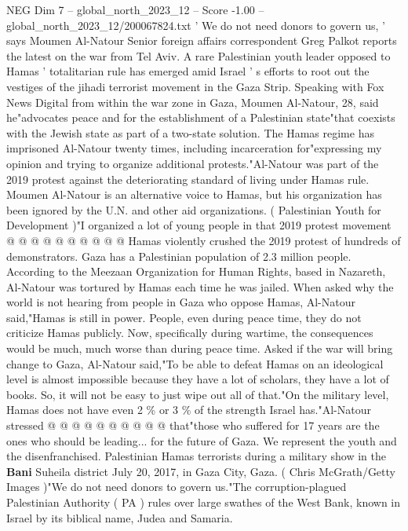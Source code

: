 \begin{textsample}{NEG Dim 7 – global\_north\_2023\_12 – Score -1.00 – global\_north\_2023\_12/200067824.txt}  \label{ex:f7_neg_301}
' We do not need donors to govern us, ' says Moumen Al-Natour Senior foreign affairs correspondent Greg Palkot reports the latest on the war from Tel Aviv.
A rare Palestinian youth leader opposed to Hamas ' totalitarian rule has emerged amid Israel ' s efforts to root out the vestiges of the jihadi terrorist movement in the Gaza Strip.
Speaking with Fox News Digital from within the war zone in Gaza, Moumen Al-Natour, 28, said he"advocates peace and for the establishment of a Palestinian state"that coexists with the Jewish state as part of a two-state solution.
The Hamas regime has imprisoned Al-Natour twenty times, including incarceration for"expressing my opinion and trying to organize additional protests."Al-Natour was part of the 2019 protest against the deteriorating standard of living under Hamas rule.
Moumen Al-Natour is an alternative voice to Hamas, but his organization has been ignored by the U.N. and other aid organizations. ( Palestinian Youth for Development )"I organized a lot of young people in that 2019 protest movement @ @ @ @ @ @ @ @ @ @ Hamas violently crushed the 2019 protest of hundreds of demonstrators.
Gaza has a Palestinian population of 2.3 million people.
According to the Meezaan Organization for Human Rights, based in Nazareth, Al-Natour was tortured by Hamas each time he was jailed.
When asked why the world is not hearing from people in Gaza who oppose Hamas, Al-Natour said,"Hamas is still in power.
People, even during peace time, they do not criticize Hamas publicly.
Now, specifically during wartime, the consequences would be much, much worse than during peace time.
Asked if the war will bring change to Gaza, Al-Natour said,"To be able to defeat Hamas on an ideological level is almost impossible because they have a lot of scholars, they have a lot of books.
So, it will not be easy to just wipe out all of that."On the military level, Hamas does not have even 2 \% or 3 \% of the strength Israel has."Al-Natour stressed @ @ @ @ @ @ @ @ @ @ that"those who suffered for 17 years are the ones who should be leading... for the future of Gaza.
We represent the youth and the disenfranchised.
Palestinian Hamas terrorists during a military show in the \textbf{Bani} Suheila district July 20, 2017, in Gaza City, Gaza. ( Chris McGrath/Getty Images )"We do not need donors to govern us."The corruption-plagued Palestinian Authority ( PA ) rules over large swathes of the West Bank, known in Israel by its biblical name, Judea and Samaria.

\end{textsample}
